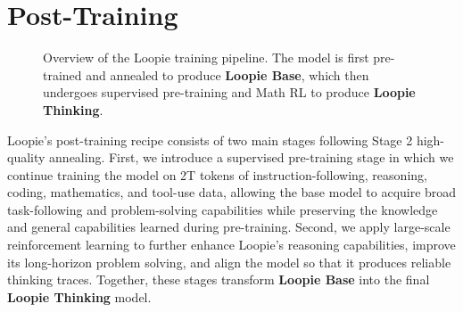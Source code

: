 \section{Post-Training}

\begin{figure}[H]
\centering
{}
\caption{Overview of the Loopie training pipeline. The model is first pre-trained and annealed to produce \textbf{Loopie Base}, which then undergoes supervised pre-training and Math RL to produce \textbf{Loopie Thinking}.}
\label{fig:posttraining-pipeline}
\end{figure}

Loopie's post-training recipe consists of two main stages following Stage 2 high-quality annealing. First, we introduce a supervised pre-training stage in which we continue training the model on 2T tokens of instruction-following, reasoning, coding, mathematics, and tool-use data, allowing the base model to acquire broad task-following and problem-solving capabilities while preserving the knowledge and general capabilities learned during pre-training. Second, we apply large-scale reinforcement learning to further enhance Loopie's reasoning capabilities, improve its long-horizon problem solving, and align the model so that it produces reliable thinking traces. Together, these stages transform \textbf{Loopie Base} into the final \textbf{Loopie Thinking} model.

